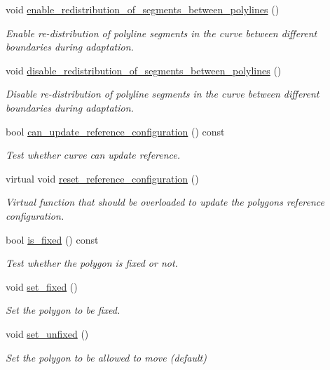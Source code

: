 \begin{DoxyCompactItemize}
$$void \hyperlink{classoomph_1_1TriangleMeshPolygon_af3988a8dfd66d748819bacdff868715d}{enable\+\_\+redistribution\+\_\+of\+\_\+segments\+\_\+between\+\_\+polylines} ()
\begin{DoxyCompactList}\small\item\em Enable re-\/distribution of polyline segments in the curve between different boundaries during adaptation. \end{DoxyCompactList}\item 
void \hyperlink{classoomph_1_1TriangleMeshPolygon_ac4c6fe4549c10509bf7a9d63ea2404b0}{disable\+\_\+redistribution\+\_\+of\+\_\+segments\+\_\+between\+\_\+polylines} ()
\begin{DoxyCompactList}\small\item\em Disable re-\/distribution of polyline segments in the curve between different boundaries during adaptation. \end{DoxyCompactList}\item 
bool \hyperlink{classoomph_1_1TriangleMeshPolygon_a241ca8e26e84e226e3bcb9e4f1cf1fc1}{can\+\_\+update\+\_\+reference\+\_\+configuration} () const
\begin{DoxyCompactList}\small\item\em Test whether curve can update reference. \end{DoxyCompactList}\item 
virtual void \hyperlink{classoomph_1_1TriangleMeshPolygon_a9c569f8bf7798d423356538651292996}{reset\+\_\+reference\+\_\+configuration} ()
\begin{DoxyCompactList}\small\item\em Virtual function that should be overloaded to update the polygons reference configuration. \end{DoxyCompactList}\item 
bool \hyperlink{classoomph_1_1TriangleMeshPolygon_a0ec0347a6d806f52a441d0fc7b63cece}{is\+\_\+fixed} () const
\begin{DoxyCompactList}\small\item\em Test whether the polygon is fixed or not. \end{DoxyCompactList}\item 
void \hyperlink{classoomph_1_1TriangleMeshPolygon_a359ed1b0c4a0dfd06572207a1d21f327}{set\+\_\+fixed} ()
\begin{DoxyCompactList}\small\item\em Set the polygon to be fixed. \end{DoxyCompactList}\item 
void \hyperlink{classoomph_1_1TriangleMeshPolygon_a850096fb1d02794a3103102341db4ff8}{set\+\_\+unfixed} ()
\begin{DoxyCompactList}\small\item\em Set the polygon to be allowed to move (default) \end{DoxyCompactList}\end{DoxyCompactItemize}
